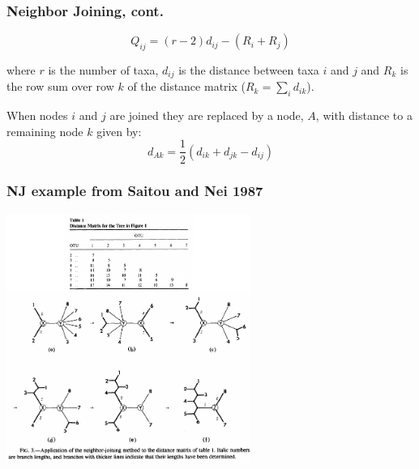 \documentclass{beamer}
\begin{document}
\begin{frame}
\frametitle{Neighbor Joining, cont.}

\[
Q_{ij} = (r - 2) d_{ij} - (R_i + R_j)
\]

where $r$ is the number of taxa, $d_{ij}$ is the distance between taxa $i$ and $j$ and $R_k$ is the row sum over row $k$ of the distance matrix ($R_k=\sum_i d_{ik}$).

\medskip

When nodes $i$ and $j$ are joined they are replaced by a node, $A$, with distance to a remaining node $k$ given by:
\[
d_{Ak} = \frac{1}{2} (d_{ik} + d_{jk} - d_{ij})
\]
    
\end{frame}

\begin{frame}
\frametitle{NJ example from Saitou and Nei 1987}
\begin{center}
\includegraphics[height=3.2in]{saitou-nj-example.pdf}    
\end{center}
\end{frame}
\end{document}
